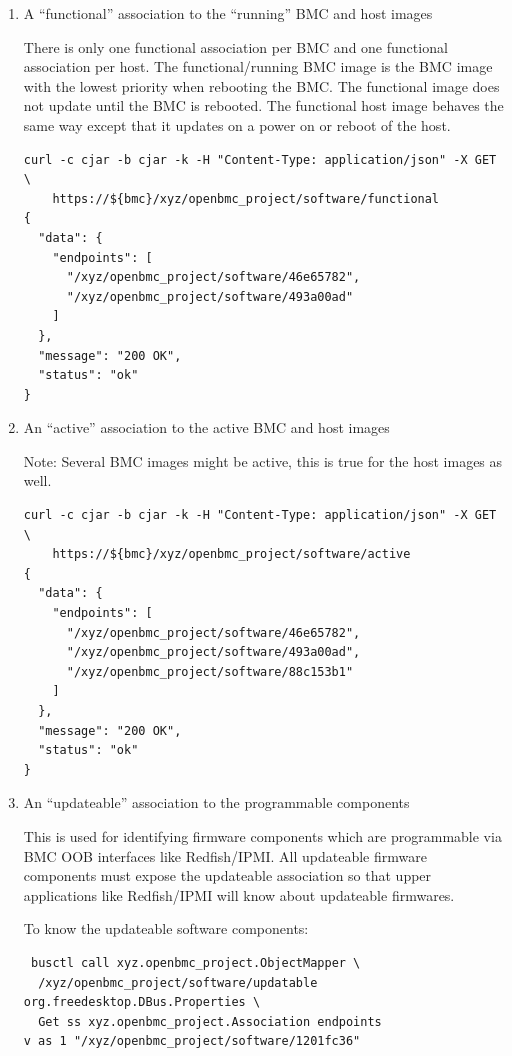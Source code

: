 \begin{enumerate}
\def\labelenumi{\arabic{enumi}.}
\item
  A ``functional'' association to the ``running'' BMC and host images

  There is only one functional association per BMC and one functional
  association per host. The functional/running BMC image is the BMC
  image with the lowest priority when rebooting the BMC. The functional
  image does not update until the BMC is rebooted. The functional host
  image behaves the same way except that it updates on a power on or
  reboot of the host.

\begin{verbatim}
curl -c cjar -b cjar -k -H "Content-Type: application/json" -X GET \
    https://${bmc}/xyz/openbmc_project/software/functional
{
  "data": {
    "endpoints": [
      "/xyz/openbmc_project/software/46e65782",
      "/xyz/openbmc_project/software/493a00ad"
    ]
  },
  "message": "200 OK",
  "status": "ok"
}
\end{verbatim}
\item
  An ``active'' association to the active BMC and host images

  Note: Several BMC images might be active, this is true for the host
  images as well.

\begin{verbatim}
curl -c cjar -b cjar -k -H "Content-Type: application/json" -X GET \
    https://${bmc}/xyz/openbmc_project/software/active
{
  "data": {
    "endpoints": [
      "/xyz/openbmc_project/software/46e65782",
      "/xyz/openbmc_project/software/493a00ad",
      "/xyz/openbmc_project/software/88c153b1"
    ]
  },
  "message": "200 OK",
  "status": "ok"
}
\end{verbatim}
\item
  An ``updateable'' association to the programmable components

  This is used for identifying firmware components which are
  programmable via BMC OOB interfaces like Redfish/IPMI. All updateable
  firmware components must expose the updateable association so that
  upper applications like Redfish/IPMI will know about updateable
  firmwares.

  To know the updateable software components:

\begin{verbatim}
 busctl call xyz.openbmc_project.ObjectMapper \
  /xyz/openbmc_project/software/updatable org.freedesktop.DBus.Properties \
  Get ss xyz.openbmc_project.Association endpoints
v as 1 "/xyz/openbmc_project/software/1201fc36"
\end{verbatim}


\end{enumerate}
